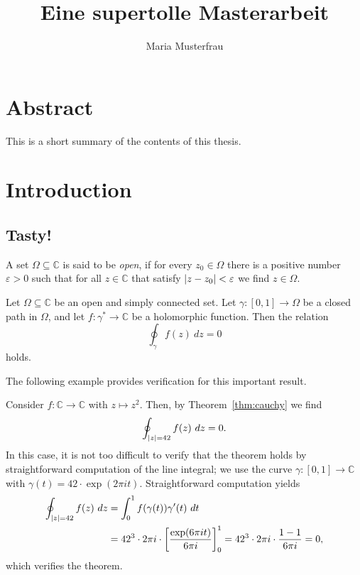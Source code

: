 \documentclass[11pt, twoside, withdegree]{bhthesis}
\title{Eine supertolle Masterarbeit}
\author{Maria Musterfrau}
\DeclarePairedDelimiter{\abs}{\lvert}{\rvert}
\begin{document}
\maketitle

\chapter*{Abstract}
This is a short summary of the contents of this thesis.

\tableofcontents

\chapter{Introduction}\label{chap:intro}

\section{Tasty!}

\begin{definition}
  A set $\Omega\subseteq\mathbb{C}$ is said to be \emph{open}, if for every
  $z_{0}\in\Omega$ there is a positive number $\varepsilon > 0$ such
  that for all $z\in\mathbb{C}$ that satisfy $\abs{z - z_{0}} <
  \varepsilon$ we find $z\in\Omega$.
\end{definition}

\begin{theorem}\label{thm:cauchy}
  Let $\Omega\subseteq\mathbb{C}$ be an open and simply connected
  set. Let $\gamma:[0,1]\to \Omega$ be a closed path in $\Omega$, and
  let $f\colon\gamma^{*} \to \mathbb{C}$ be a holomorphic function.
  Then the relation
  \begin{equation}\label{eq:cauchy-integral}
    \oint_{\gamma} f(z)~dz = 0
  \end{equation}
  holds.
\end{theorem}

The following example provides verification for this important result.

\begin{example}
  Consider $f\colon \mathbb{C} \to \mathbb{C}$ with $z\mapsto
  z^{2}$. Then, by Theorem~\ref{thm:cauchy} we find
  \[ \oint_{\abs{z} = 42} f(z)~dz = 0.  \]
  In this case, it is not too difficult to verify that the theorem
  holds by straightforward computation of the line integral; we use
  the curve $\gamma\colon [0,1]\to \mathbb{C}$ with $\gamma(t) =
  42\cdot\exp(2\pi i t)$. Straightforward computation yields
  \begin{align*}
    \oint_{\abs{z} = 42} f(z)~dz
    &= \int_{0}^{1} f(\gamma(t)) \gamma'(t)~dt\\
    &= 42^{3}\cdot 2\pi i \cdot \biggl[\frac{\exp(6 \pi i t)}{6 \pi
      i}\biggr]_{0}^{1} = 42^{3}\cdot 2\pi i\cdot \frac{1 - 1}{6\pi
      i} = 0,
  \end{align*}
  which verifies the theorem.
\end{example}
\end{document}

